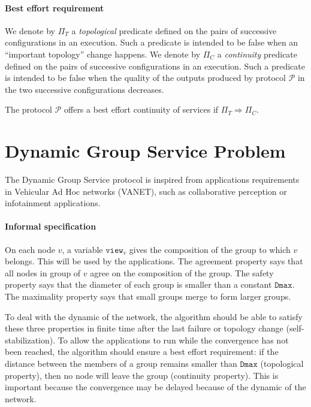 \documentclass[11pt,english]{article}
\begin{document}
\paragraph{Best effort requirement}
We denote by $\Pi_T$ a \emph{topological} predicate defined on the pairs of
successive configurations in an execution. Such a predicate is intended to be
false when an ``important topology'' change happens.
We denote by $\Pi_C$ a \emph{continuity} predicate defined on the pairs of
successive configurations in an execution. Such a predicate is intended to be
false when the quality of the outputs produced by protocol
$\mathcal{P}$ in the two successive configurations decreases.

The protocol $\mathcal{P}$ offers a best effort continuity of services if $\Pi_T
\Rightarrow \Pi_C$.




\section{Dynamic Group Service Problem}\label{s:spec}

The Dynamic Group Service protocol is inspired from applications requirements in
Vehicular Ad Hoc networks (VANET), such as collaborative perception or
infotainment applications.

\paragraph{Informal specification} On each node $v$, a variable
$\texttt{view}_v$ gives the composition of the group to which $v$ belongs. This
will be used by the applications. The agreement property says that all nodes in
group of $v$ agree on the composition of the group. The safety property says
that the diameter of each group is smaller than a constant $\texttt{Dmax}$. The
maximality property says that small groups merge to form larger groups.

To deal with the dynamic of the network, the algorithm should be able to satisfy
these three properties in finite time after the last failure or topology change
(self-stabilization). To allow the applications to run while the convergence has
not been reached, the algorithm should ensure a best effort requirement: if the
distance between the members of a group remains smaller than $\texttt{Dmax}$
(topological property), then no node will leave the group (continuity
property). This is important because the convergence may be delayed because of
the dynamic of the network.
\end{document}
